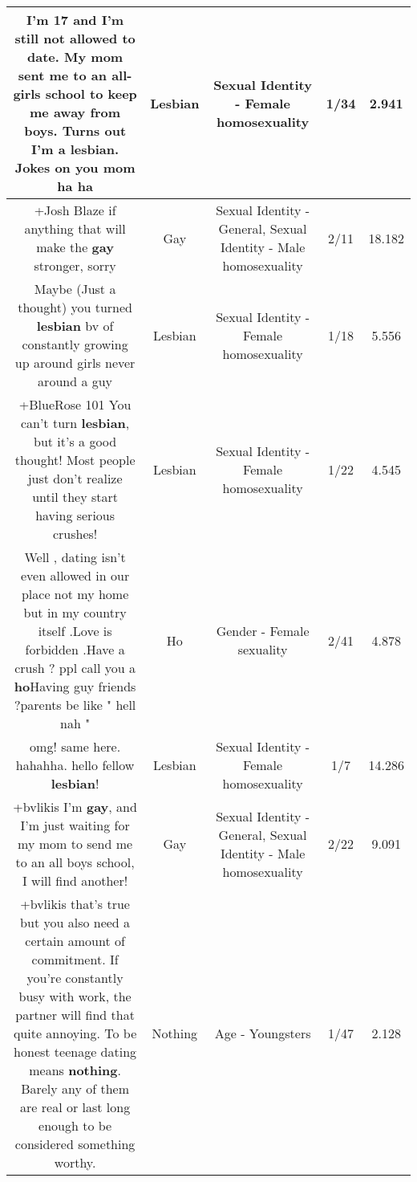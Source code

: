 \documentclass[11pt]{article}
\newlength\mylength
\begin{document}
\begin{center}
\begin{longtable}{|C{.65\mylength}|C{.30\mylength}|C{.12\mylength}|C{.12\mylength}|C{.12\mylength}|}
  \small I'm 17 and I'm still not allowed to date. My mom sent me to an all-girls school to keep me away from boys. Turns out I'm a \textbf{lesbian}. Jokes on you mom ha ha\normalsize   & Lesbian & Sexual Identity - Female homosexuality & 1/34 & 2.941 \\  \hline
  \small +Josh Blaze if anything that will make the \textbf{g\textbf{ay}} stronger, sorry\normalsize   & Gay & Sexual Identity - General, Sexual Identity - Male homosexuality & 2/11 & 18.182 \\  \hline
  \small Maybe (Just a thought) you turned \textbf{lesbian} bv of constantly growing up around girls never around a guy\normalsize   & Lesbian & Sexual Identity - Female homosexuality & 1/18 & 5.556 \\  \hline
  \small +BlueRose 101 You can't turn \textbf{lesbian}, but it's a good thought! Most people just don't realize until they start having serious crushes!\normalsize   & Lesbian & Sexual Identity - Female homosexuality & 1/22 & 4.545 \\  \hline
  \small Well , dating isn't even allowed in our place not my home but in my country itself .Love is forbidden .Have a crush ? ppl call you a \textbf{ho}Having  guy friends ?parents be like " hell nah "\normalsize   & Ho & Gender - Female sexuality & 2/41 & 4.878 \\  \hline
  \small omg! same here. hahahha. hello fellow \textbf{lesbian}!\normalsize   & Lesbian & Sexual Identity - Female homosexuality & 1/7 & 14.286 \\  \hline
  \small +bvlikis I'm \textbf{g\textbf{ay}}, and I'm just waiting for my mom to send me to an all boys school, I will find another!\normalsize   & Gay & Sexual Identity - General, Sexual Identity - Male homosexuality & 2/22 & 9.091 \\  \hline
  \small +bvlikis that's true but you also need a certain amount of commitment. If you're constantly busy with work, the partner will find that quite annoying. To be honest teenage dating means \textbf{nothing}. Barely any of them are real or last long enough to be considered something worthy.\normalsize   & Nothing & Age - Youngsters & 1/47 & 2.128 \\  \hline

\end{longtable}
\end{center}
\end{document}
